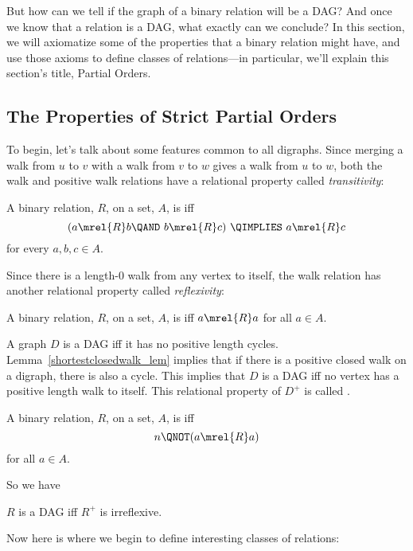 But how can we tell if the graph of a binary relation will be a DAG?
And once we know that a relation is a DAG, what exactly can we
conclude?  In this section, we will axiomatize some of the properties
that a binary relation might have, and use those axioms to define
classes of relations---in particular, we'll explain this section's
title, Partial Orders.

\subsection{The Properties of Strict Partial Orders}

To begin, let's talk about some features common to all digraphs.
Since merging a walk from $u$ to $v$ with a walk from $v$ to $w$ gives
a walk from $u$ to $w$, both the walk and positive walk relations have
a relational property called \emph{transitivity}:

\begin{definition}
A binary relation, $R$, on a set, $A$, is
 iff
\[
(a \mrel{R}  b \QAND\ b \mrel{R}  c)\ \QIMPLIES\  a \mrel{R}  c
\]
\quad for every $a,b,c\in A$.
\end{definition}

Since there is a length-0 walk from any vertex to itself, the walk
relation has another relational property called \emph{reflexivity}:

\begin{definition}
A binary relation, $R$, on a set, $A$, is  iff $a
\mrel{R} a$ for all $a \in A$.
\end{definition}

A graph $D$ is a DAG iff it has no positive length
cycles. Lemma~\ref{shortestclosedwalk_lem} implies that if there is a
positive closed walk on a digraph, there is also a cycle.  This
implies that $D$ is a DAG iff no vertex has a positive length walk to
itself.  This relational property of $D^+$ is called
.

\begin{definition}
A binary relation, $R$, on a set, $A$, is
 iff
\[n
\QNOT(a \mrel{R} a)
\]
for all $a \in A$.
\end{definition}

So we have
\begin{lemma}\label{R+irr}
$R$ is a DAG iff $R^+$ is irreflexive.
\end{lemma}

Now here is where we begin to define interesting classes of relations:

